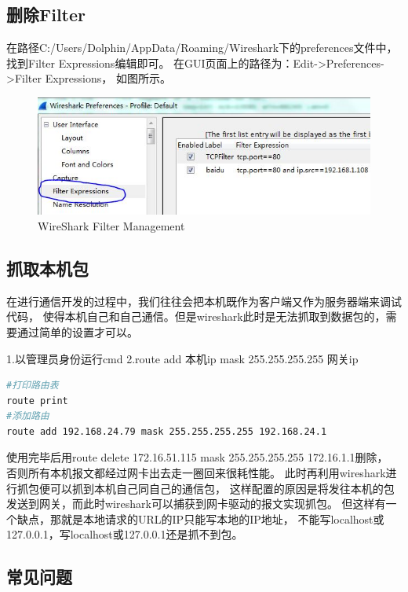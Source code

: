 \documentclass{book}
\begin{document}
\subsection{删除Filter}

在路径C:/Users/Dolphin/AppData/Roaming/Wireshark下的preferences文件中，
找到Filter Expressions编辑即可。
在GUI页面上的路径为：Edit->Preferences->Filter Expressions，
如图所示。

\begin{figure}[htbp]
	\centering
	\includegraphics[scale=0.6]{WireSharkFilterManagement.jpg}
	\caption{WireShark Filter Management}
	\label{fig:WireSharkFilterManagement}
\end{figure}

\subsection{抓取本机包}

在进行通信开发的过程中，我们往往会把本机既作为客户端又作为服务器端来调试代码，
使得本机自己和自己通信。但是wireshark此时是无法抓取到数据包的，需要通过简单的设置才可以。

1.以管理员身份运行cmd
2.route add 本机ip mask 255.255.255.255 网关ip

\begin{lstlisting}[language=Bash]
#打印路由表
route print
#添加路由
route add 192.168.24.79 mask 255.255.255.255 192.168.24.1
\end{lstlisting}

使用完毕后用route delete 172.16.51.115 mask 255.255.255.255 172.16.1.1删除，
否则所有本机报文都经过网卡出去走一圈回来很耗性能。
此时再利用wireshark进行抓包便可以抓到本机自己同自己的通信包，
这样配置的原因是将发往本机的包发送到网关，而此时wireshark可以捕获到网卡驱动的报文实现抓包。
但这样有一个缺点，那就是本地请求的URL的IP只能写本地的IP地址，
不能写localhost或127.0.0.1，写localhost或127.0.0.1还是抓不到包。


\subsection{常见问题}
\end{document}
